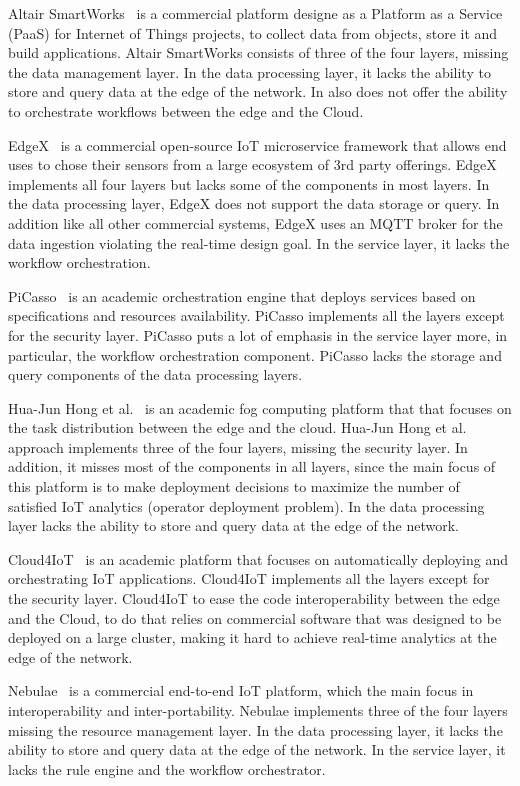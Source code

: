 Altair SmartWorks~\cite{Altair_Smartworks} is a commercial platform designe as a Platform as a Service (PaaS) for Internet of Things projects, to collect data from objects, store it and build applications. Altair SmartWorks consists of three of the four layers, missing the data management layer. In the data processing layer, it lacks the ability to store and query data at the edge of the network. In also does not offer the ability to orchestrate workflows between the edge and the Cloud.

EdgeX~\cite{edgex} is a commercial open-source IoT microservice framework that allows end uses to chose their sensors from a large ecosystem of 3rd party offerings. EdgeX implements all four layers but lacks some of the components in most layers. In the data processing layer, EdgeX does not support the data storage or query. In addition like all other commercial systems, EdgeX uses an MQTT broker for the data ingestion violating the real-time design goal. In the service layer, it lacks the workflow orchestration.

PiCasso~\cite{8071529} is an academic orchestration engine that deploys services based on specifications and resources availability. PiCasso implements all the layers except for the security layer. PiCasso puts a lot of emphasis in the service layer more, in particular, the workflow orchestration component. PiCasso lacks the storage and query components of the data processing layers.

Hua-Jun Hong et al.~\cite{8241101} is an academic fog computing platform that that focuses on the task distribution between the edge and the cloud. Hua-Jun Hong et al. approach implements three of the four layers, missing the security layer. In addition, it misses most of the components in all layers, since the main focus of this platform is to make deployment decisions to maximize the number of satisfied IoT analytics (operator deployment problem). In the data processing layer lacks the ability to store and query data at the edge of the network.

Cloud4IoT~\cite{7830723} is an academic platform that focuses on automatically deploying and orchestrating IoT applications. Cloud4IoT implements all the layers except for the security layer. Cloud4IoT to ease the code interoperability between the edge and the Cloud, to do that relies on commercial software that was designed to be deployed on a large cluster, making it hard to achieve real-time analytics at the edge of the network.

Nebulae~\cite{Nebulae} is a commercial end-to-end IoT platform, which the main focus in interoperability and inter-portability. Nebulae implements three of the four layers missing the resource management layer. In the data processing layer, it lacks the ability to store and query data at the edge of the network. In the service layer, it lacks the rule engine and the workflow orchestrator.

